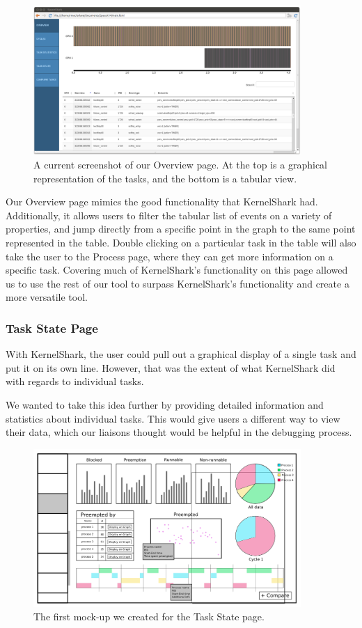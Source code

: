 \documentclass{hmcclinic}
\begin{document}
\begin{figure}[H]
\begin{center}
\includegraphics[width=4in]{overview-page.png}
\caption{A current screenshot of our Overview page. At the top is a graphical
representation of the tasks, and the bottom is a tabular view.}
\end{center}
\end{figure}

Our Overview page mimics the good
functionality that KernelShark had. Additionally, it allows users to filter the
tabular list of events on a variety of properties, and jump directly from a
specific point in the graph to the same point represented in the table. Double
clicking on a particular task in the table will also take the user to the
Process page, where they can get more information on a specific task. Covering
much of KernelShark's functionality on this page allowed us to use the rest of
our tool to surpass KernelShark's functionality and create a more versatile
tool.

\subsubsection{Task State Page}

With KernelShark, the user could pull out a graphical display of a single
task and put it on its own line. However, that was the extent of what
KernelShark did with regards to individual tasks.

We wanted to take this idea further by providing detailed information and
statistics about individual tasks. This would give users a different way to view
their data, which our liaisons thought would be helpful
in the debugging process.

\begin{figure}[H]
\begin{center}
\includegraphics[width=4in]{perProcess-49.png}
\caption{The first mock-up we created for the Task State page.}
\end{center}
\end{figure}
\end{document}

